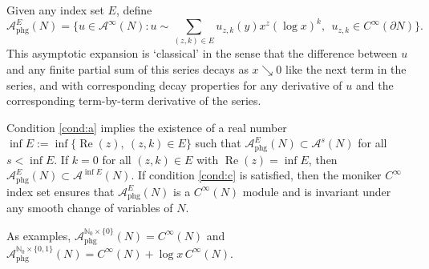 \documentclass[JEP,XML,SOM,Unicode,NoFloatCountersInSection, NoEqCountersInSection,published]{cedram}
\DeclareMathOperator{\Real}{Re}
\theoremstyle{plain}
\theoremstyle{definition}
\theoremstyle{remark}
\def\Nm{{\mathbb{N}}}
\def\A{\mathcal{A}}
\newcommand{\del}{\partial}
\begin{document}
Given any index set $E$, define
\begin{equation*}
\A_{\mathrm{phg}}^E(N) = \biggl\{u \in \A^\infty(N): u \sim \sum_{(z,k) \in E} u_{z,k}(y) x^z (\log x)^k,\ \ u_{z,k} \in C^\infty(\del N) \biggr\}.
\end{equation*}
This asymptotic expansion is `classical' in the sense that the difference between $u$ and any finite partial sum of this series decays as $x \searrow 0$
like the next term in the series, and with corresponding decay properties for any derivative of $u$ and the corresponding term-by-term derivative of the series.

Condition \eqref{cond:a} implies the existence of a real number $\inf E := \inf \{\Real (z),\ (z,k)\in E\}$ such that $\A_{\mathrm{phg}}^E(N)\subset \A^s(N)$
for all $s<\inf E$. If $k=0$ for all $(z,k)\in E$ with $\Real(z) = \inf E$, then $\A_{\mathrm{phg}}^E(N) \subset \A^{\inf E}(N)$.
If condition \eqref{cond:c} is satisfied, then the moniker $C^\infty$ index set ensures that $\A_{\mathrm{phg}}^E(N)$ is a $C^\infty(N)$ module and is
invariant under any smooth change of variables of $N$.

As examples, $\A_{\mathrm{phg}}^{\Nm_0\times \{0\}}(N) = C^\infty(N)$ and $\A_{\mathrm{phg}}^{\Nm_0\times \{0,1\}}(N) = C^\infty(N)+\log x \, C^\infty(N)$.
\end{document}
